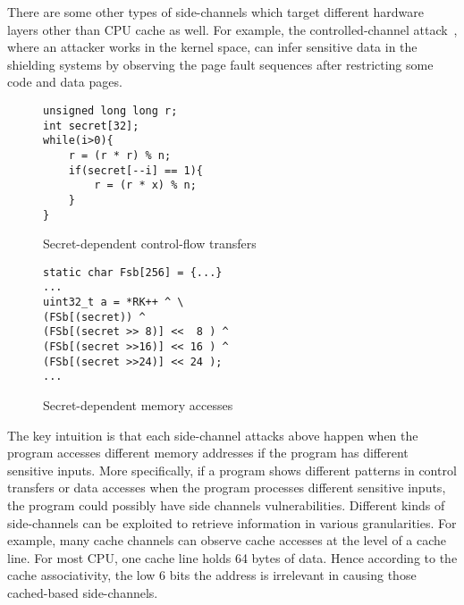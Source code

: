 There are some other types of side-channels which target different hardware
layers other than CPU cache as well. For example, the controlled-channel
attack~\cite{7163052}, where an attacker works in the kernel space, can infer
sensitive data in the shielding systems by observing the page fault sequences
after restricting some code and data pages.

\begin{figure}[]

    \noindent\begin{minipage}{0.45\linewidth}
        \noindent
        \begin{lstlisting}[numbers = none]
unsigned long long r;
int secret[32];
while(i>0){
    r = (r * r) % n;
    if(secret[--i] == 1){
        r = (r * x) % n;
    }
}
        \end{lstlisting}
        \caption{Secret-dependent control-flow transfers}
    \end{minipage}
    \hfill
    \begin{minipage}{0.45\linewidth}
        \begin{lstlisting}[numbers = none]
static char Fsb[256] = {...}
... 
uint32_t a = *RK++ ^ \ 
(FSb[(secret)) ^
(FSb[(secret >> 8)] <<  8 ) ^
(FSb[(secret >>16)] << 16 ) ^
(FSb[(secret >>24)] << 24 );
...
        \end{lstlisting}
        \caption{Secret-dependent memory accesses}
    \end{minipage}
\end{figure}

The key intuition is that each side-channel attacks above happen when the
program accesses different memory addresses if the program has different
sensitive inputs. More specifically, if a program shows different patterns in
control transfers or data accesses when the program processes different
sensitive inputs, the program could possibly have side channels vulnerabilities.
Different kinds of side-channels can be exploited to retrieve information in
various granularities. For example, many cache channels can observe cache
accesses at the level of a cache line. For most CPU, one cache line holds 64
bytes of data. Hence according to the cache associativity, the low 6 bits the
address is irrelevant in causing those cached-based side-channels.

%

